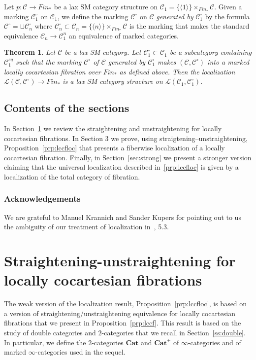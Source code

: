 \documentclass[12pt]{amsart}%
\newtheorem{thm}[subsubsection]{Theorem}
\newcommand{\bfCat}{\mathbf{Cat}}
\newcommand{\eq}{\mathit{eq}}
\newcommand{\Fin}{\mathit{Fin}}
\newcommand{\cC}{\mathcal{C}}
\newcommand{\cL}{\mathcal{L}}
\begin{document}
Let $p:\cC\to\Fin_*$ be a lax SM category structure on $\cC_1=\{\langle 1\rangle\}\times_{\Fin_*}\cC$. Given a marking $\cC_1^\circ$ on  $\cC_1$,
we define the marking $\cC^\circ$ on $\cC$ {\sl generated by }
$\cC_1^\circ$ by the formula $\cC^\circ=\sqcup\cC_n^\circ$ where
$\cC_n^\circ\subset\cC_n=\{\langle n\rangle\}\times_{\Fin_*}\cC$ is the 
marking  that makes the standard equivalence $\cC_n\to\cC_1^n$ an 
equivalence of marked categories.


 
\begin{thm}
\label{thm:laxSMloc}
Let $\cC$ be a lax SM category. Let $\cC^\circ_1\subset\cC_1$ be a subcategory containing $\cC_1^\eq$ such that the 
marking $\cC^\circ$ of $\cC$ generated by $\cC^\circ_1$ makes $(\cC,\cC^\circ)$ into a marked locally cocartesian fibration over $\Fin_*$
as defined above.
Then the localization $\cL(\cC,\cC^\circ)\to\Fin_*$ is a lax SM category structure on  $\cL(\cC_1,\cC^\circ_1)$. 
\end{thm}

\subsection{Contents of the sections} In Section~\ref{sec:strunstr} we review the straightening and unstraightening for locally cocartesian fibrations.  In Section 3 we prove, using straigtening--unstraightening, 
Proposition~\ref{prp:lccfloc} that presents a fiberwise localization
of a locally cocartesian fibration. Finally, in Section~\ref{sec:strong}
we present a stronger version claiming that the universal localization described in~\ref{prp:lccfloc} is given by a  localization of the total category of fibration.

\subsubsection{Acknowledgements}We are grateful to 
 Manuel Krannich and Sander Kupers for pointing out to us the ambiguity 
 of our treatment of localization in~\cite{HM}, 5.3.





\section{Straightening-unstraightening for locally cocartesian fibrations}
\label{sec:strunstr}
The weak version of the localization result,
Proposition~\ref{prp:lccfloc}, is based on  a  version of
straightening/unstraightening equivalence for locally cocartesian 
fibrations that  we present in Proposition~\ref{prp:lccf}. This result
is based on the study of double categories and $2$-categories
that we   recall in Section~\ref{ss:double}. In particular, we  define 
the $2$-categories $\bfCat$ and $\bfCat^+$ of $\infty$-categories and of marked $\infty$-categories used in the sequel.  
\end{document}
